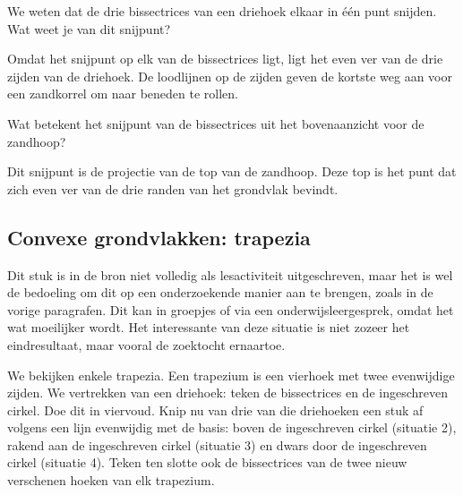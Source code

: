 \documentclass{ximera}
\begin{document}
\begin{exercise}
    We weten dat de drie bissectrices van een driehoek elkaar in \'e\'en punt snijden. Wat
    weet je van dit snijpunt?
    \begin{oplossing}
        Omdat het snijpunt op elk van de bissectrices ligt, ligt het even ver van de drie
        zijden van de driehoek. De loodlijnen op de zijden geven de kortste weg aan voor een
        zandkorrel om naar beneden te rollen.
    \end{oplossing}
\end{exercise}


\begin{exercise}
    Wat betekent het snijpunt van de bissectrices uit het bovenaanzicht voor de zandhoop?
    \begin{oplossing}
        Dit snijpunt is de projectie van de top van de zandhoop. Deze top is het punt dat
        zich even ver van de drie randen van het grondvlak bevindt.
    \end{oplossing}
\end{exercise}


\subsection*{Convexe grondvlakken: trapezia}

\begin{instructorNotes}
    Dit stuk is in de bron niet volledig als lesactiviteit uitgeschreven, maar het is wel
    de bedoeling om dit op een onderzoekende manier aan te brengen, zoals in de vorige
    paragrafen. Dit kan in groepjes of via een onderwijsleergesprek, omdat het wat
    moeilijker wordt. Het interessante van deze situatie is niet zozeer het eindresultaat,
    maar vooral de zoektocht ernaartoe.
\end{instructorNotes}

We bekijken enkele trapezia. Een trapezium is een vierhoek met twee evenwijdige zijden.
We vertrekken van een driehoek: teken de bissectrices en de ingeschreven cirkel. Doe dit
in viervoud. Knip nu van drie van die driehoeken een stuk af volgens een lijn evenwijdig
met de basis: boven de ingeschreven cirkel (situatie 2), rakend aan de ingeschreven cirkel
(situatie 3) en dwars door de ingeschreven cirkel (situatie 4). Teken ten slotte ook de
bissectrices van de twee nieuw verschenen hoeken van elk trapezium.
\end{document}
